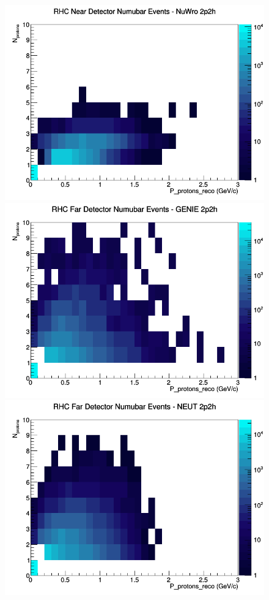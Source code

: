 \begin{figure}[h]
\includegraphics[width=\linewidth]{eff_N_P/FGT/protons/2p2h_RHC_ND_numubar_N_P_NuWro.png}
\endminipage
\newline
{}
\includegraphics[width=\linewidth]{eff_N_P/FGT/protons/2p2h_RHC_FD_numubar_N_P_GENIE.png}
\endminipage
{}
\includegraphics[width=\linewidth]{eff_N_P/FGT/protons/2p2h_RHC_FD_numubar_N_P_NEUT.png}

\end{figure}
